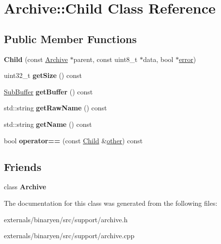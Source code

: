\hypertarget{class_archive_1_1_child}{}\section{Archive\+:\+:Child Class Reference}
\label{class_archive_1_1_child}
\subsection*{Public Member Functions}
\begin{DoxyCompactItemize}
\item 
\mbox{\label{class_archive_1_1_child_a55a55ad7f74168b4e8c57bc83ee264a4}} 
{\bfseries Child} (const \mbox{\hyperlink{class_archive}{Archive}} $\ast$parent, const uint8\+\_\+t $\ast$data, bool $\ast$\mbox{\hyperlink{structerror}{error}})
\item 
\mbox{\label{class_archive_1_1_child_ae959b79cc46c7ae91671402dca75a468}} 
uint32\+\_\+t {\bfseries get\+Size} () const
\item 
\mbox{\label{class_archive_1_1_child_ac4c037165d206bed103f6609f681fa78}} 
\mbox{\hyperlink{struct_archive_1_1_sub_buffer}{Sub\+Buffer}} {\bfseries get\+Buffer} () const
\item 
\mbox{\label{class_archive_1_1_child_ac68a7505c1f2714704c64cc86f794836}} 
std\+::string {\bfseries get\+Raw\+Name} () const
\item 
\mbox{\label{class_archive_1_1_child_ab06d011602992586cf95e7547631867b}} 
std\+::string {\bfseries get\+Name} () const
\item 
\mbox{\label{class_archive_1_1_child_a719e037d44e1a4047e8ccbdd98645ff5}} 
bool {\bfseries operator==} (const \mbox{\hyperlink{class_archive_1_1_child}{Child}} \&\mbox{\hyperlink{structother}{other}}) const
\end{DoxyCompactItemize}
\subsection*{Friends}
\begin{DoxyCompactItemize}
\item 
\mbox{\label{class_archive_1_1_child_a4f1345bc28f2fd55b5ef2717d251ceea}} 
class {\bfseries Archive}
\end{DoxyCompactItemize}


The documentation for this class was generated from the following files\+:\begin{DoxyCompactItemize}
\item 
externals/binaryen/src/support/archive.\+h\item 
externals/binaryen/src/support/archive.\+cpp\end{DoxyCompactItemize}
